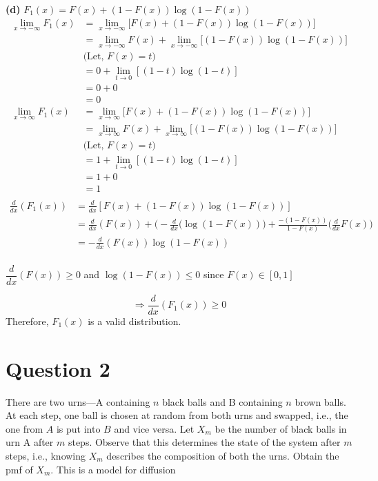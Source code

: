 \documentclass{article}
\begin{document}
\textbf{(d)} $F_1(x)=F(x)+(1-F(x))\log(1-F(x))$\\
\begin{align*}
    \lim_{x\to -\infty}F_1(x) &= \lim_{x\to -\infty}\Big[F(x)+(1-F(x))\log(1-F(x))\Big]\\
    &= \lim_{x\to -\infty}F(x) + \lim_{x\to -\infty}\Big[(1-F(x))\log(1-F(x))\Big]\\
    &\text{(Let, $F(x)=t$)}\\
    &= 0 + \lim_{t\to 0}[(1-t)\log(1-t)]\\
    &= 0+0\\
    &=0\\
    \lim_{x\to \infty}F_1(x) &= \lim_{x\to \infty}\Big[F(x)+(1-F(x))\log(1-F(x))\Big]\\
    &= \lim_{x\to \infty}F(x) + \lim_{x\to \infty}\Big[(1-F(x))\log(1-F(x))\Big]\\
    &\text{(Let, $F(x)=t$)}\\
    &= 1 + \lim_{t\to 0}[(1-t)\log(1-t)]\\
    &=1+0\\
    &=1\\
\end{align*}
\begin{align*}
    \frac{d}{dx}(F_1(x)) &= \frac{d}{dx}[F(x)+(1-F(x))\log(1-F(x))]\\
    &=\frac{d}{dx}(F(x))+\Big(-\frac{d}{dx}(\log(1-F(x))\Big)+
    \frac{-(1-F(x))}{1-F(x)}\Big(\frac{d}{dx}F(x)\Big)\\
    &=-\frac{d}{dx}(F(x))\log(1-F(x))\\
\end{align*}
\begin{center}
$\dfrac{d}{dx}(F(x))\geq 0$ and $\log(1-F(x))\leq 0$ since $F(x)\in [0,1]$
\end{center}
$$\Rightarrow \frac{d}{dx}(F_1(x))\geq 0$$
Therefore, $F_1(x)$ is a valid distribution.

\section{Question 2}
\label{Q2}
  There are two urns—A containing $n$ black balls and B containing $n$ brown balls. At each step, one ball is chosen at random from both urns and swapped, i.e., the one from $A$ is put into $B$ and vice versa. Let $X_m$ be the number of black balls in urn A after $m$ steps. Observe that this determines the state of the system after $m$ steps, i.e., knowing $X_m$ describes the composition of both the urns. Obtain the pmf of $X_m$. This is a model for diffusion\\
\end{document}
